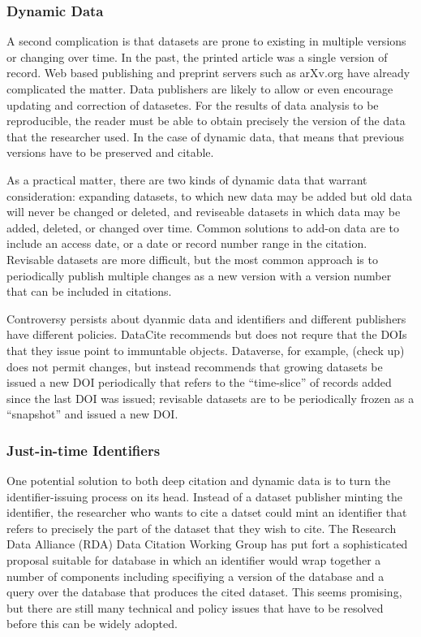 \documentclass[10pt,a4paper,twocolumn]{article}
\begin{document}
\subsubsection{Dynamic Data}\label{dynamic-data}

A second complication is that datasets are prone to existing in multiple versions or changing over time. 
In the past, the printed article was a single version of record.
Web based publishing and preprint servers such as arXv.org have already complicated the matter. 
Data publishers are likely to allow or even encourage updating and correction of datasetes. 
For the results of data analysis to be reproducible, the reader must be able to obtain precisely the version of the data that the researcher used. 
In the case of dynamic data, that means that previous versions have to be preserved and citable.

As a practical matter, there are two kinds of dynamic data that warrant consideration: expanding datasets, to which new data may be added but old data will never be changed or deleted, and reviseable datasets in which data may be added, deleted, or changed over time. 
Common solutions to add-on data are to include an access date, or a date or record number range in the citation. 
Revisable datasets are more difficult, but the most common approach is to periodically publish multiple changes as a new version with a version number that can be included in citations.

Controversy persists about dyanmic data and identifiers and different publishers have different policies. 
DataCite recommends but does not requre that the DOIs that they issue point to immuntable objects. 
Dataverse, for example, (check up) does not permit changes, but instead recommends that growing datasets be issued a new DOI periodically that refers to the ``time-slice'' of records added since the last DOI was issued; revisable datasets are to be periodically frozen as a ``snapshot'' and issued a new DOI.

\subsubsection{Just-in-time Identifiers}\label{just-in-time-identifiers}

One potential solution to both deep citation and dynamic data is to turn the identifier-issuing process on its head. 
Instead of a dataset publisher minting the identifier, the researcher who wants to cite a datset could mint an identifier that refers to precisely the part of the dataset that they wish to cite. 
The Research Data Alliance (RDA) Data Citation Working Group has put fort a sophisticated proposal suitable for database in which an identifier would wrap together a number of components including specifiying a version of the database and a query over the database that produces the cited dataset. 
This seems promising, but there are still many technical and policy issues that have to be resolved before this can be widely adopted.
\end{document}
